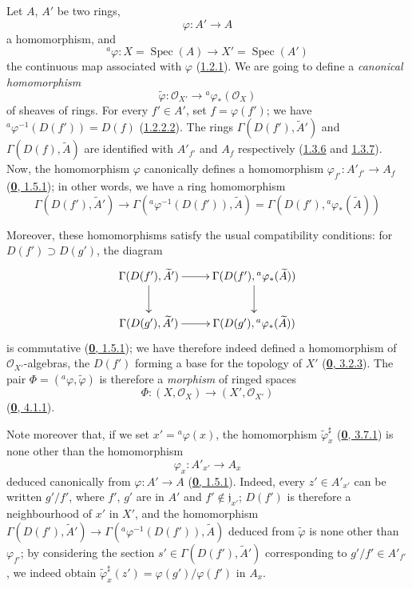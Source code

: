 \begin{env}[1.6.1]
\label{I.1.6.1}
Let $A$, $A'$ be two rings,
\[
  \varphi:A'\to A
\]
a homomorphism, and
\[
  {}^a\varphi:X=\operatorname{Spec}(A)\to
  X'=\operatorname{Spec}(A')
\]
the continuous map associated with $\varphi$
(\hyperref[I.1.2.1]{1.2.1}). We are going to define a
\emph{canonical homomorphism}
\[
  \widetilde{\varphi}:\mathscr{O}_{X'}\to
  {}^a\varphi_*(\mathscr{O}_X)
\]
of sheaves of rings. For every $f'\in A'$, set $f=\varphi(f')$; we have
${}^a\varphi^{-1}(D(f'))=D(f)$
(\hyperref[I.1.2.2.2]{1.2.2.2}). The rings
$\Gamma(D(f'),\widetilde{A}')$ and $\Gamma(D(f),\widetilde{A})$
are identified with $A'_{f'}$ and $A_f$ respectively
(\hyperref[I.1.3.6]{1.3.6} and \hyperref[I.1.3.7]{1.3.7}). Now,
the homomorphism $\varphi$ canonically defines a homomorphism
$\varphi_{f'}:A'_{f'}\to A_f$
(\hyperref[0.1.5.1]{\textbf{0}, 1.5.1}); in other words, we have a ring
homomorphism
\[
  \Gamma(D(f'),\widetilde{A}')\to
  \Gamma({}^a\varphi^{-1}(D(f')),\widetilde{A})
  =\Gamma(D(f'),{}^a\varphi_*(\widetilde{A}))
\]

Moreover, these homomorphisms satisfy the usual compatibility
conditions: for $D(f')\supset D(g')$, the diagram
\[
  \xymatrix{
    \Gamma(D(f'),\widetilde{A}')\ar[r]\ar[d] &
    \Gamma(D(f'),{}^a\varphi_*(\widetilde{A}))\ar[d]\\
    \Gamma(D(g'),\widetilde{A}')\ar[r] &
    \Gamma(D(g'),{}^a\varphi_*(\widetilde{A}))
  }
\]
is commutative (\hyperref[0.1.5.1]{\textbf{0}, 1.5.1}); we have therefore indeed
defined a homomorphism of $\mathscr{O}_{X'}$-algebras, the $D(f')$ forming a
base for the topology of $X'$ (\hyperref[0.3.2.3]{\textbf{0}, 3.2.3}). The pair
$\Phi=({}^a\varphi,\widetilde{\varphi})$ is therefore a \emph{morphism}
of ringed spaces
\[
  \Phi:(X,\mathscr{O}_X)\to(X',\mathscr{O}_{X'})
\]
(\hyperref[0.4.1.1]{\textbf{0}, 4.1.1}).

Note moreover that, if we set $x'={}^a\varphi(x)$, the homomorphism
$\widetilde{\varphi}_x^{\sharp}$ (\hyperref[0.3.7.1]{\textbf{0}, 3.7.1}) is none other
than the homomorphism
\[
  \varphi_x:A'_{x'}\to A_x
\]
deduced canonically from $\varphi:A'\to A$
(\hyperref[0.1.5.1]{\textbf{0}, 1.5.1}). Indeed, every $z'\in A'_{x'}$
can be written $g'/f'$, where $f'$, $g'$ are in $A'$ and
$f'\notin\mathfrak{j}_{x'}$; $D(f')$ is therefore a neighbourhood of $x'$ in
$X'$, and the homomorphism
$\Gamma(D(f'),\widetilde{A}')\to
\Gamma({}^a\varphi^{-1}(D(f')),\widetilde{A})$ deduced from
$\widetilde{\varphi}$ is none other than $\varphi_{f'}$; by considering the
section $s'\in\Gamma(D(f'),\widetilde{A}')$ corresponding to
$g'/f'\in A'_{f'}$, we indeed obtain
$\widetilde{\varphi}_x^{\sharp}(z')=\varphi(g')/\varphi(f')$ in $A_x$.
\end{env}

